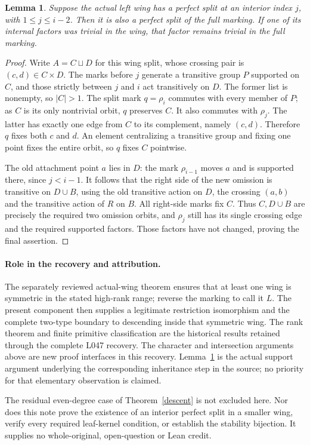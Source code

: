 \documentclass[11pt,a4paper]{article}
\newtheorem{lemma}[theorem]{Lemma}
\begin{document}
\begin{lemma}\label{inherit}
Suppose the actual left wing has a perfect split at an interior
index $j$, with $1\le j\le i-2$. Then it is also a perfect split
of the full marking. If one of its internal factors was trivial
in the wing, that factor remains trivial in the full marking.
\end{lemma}
\begin{proof}
Write $A=C\sqcup D$ for this wing split, whose crossing pair is
$(c,d)\in C\times D$. The marks before $j$ generate a transitive
group $P$ supported on $C$, and those strictly between $j$ and
$i$ act transitively on $D$. The former list is nonempty, so
$|C|>1$. The split mark $q=\rho_i$ commutes with every member
of $P$; as $C$ is its only nontrivial orbit, $q$ preserves $C$.
It also commutes with $\rho_j$. The latter has exactly one
edge from $C$ to its complement, namely $(c,d)$. Therefore $q$
fixes both $c$ and $d$. An element centralizing a transitive
group and fixing one point fixes the entire orbit, so $q$
fixes $C$ pointwise.

The old attachment point $a$ lies in $D$: the mark
$\rho_{i-1}$ moves $a$ and is supported there, since $j<i-1$.
It follows that the right side of the new omission is transitive
on $D\cup B$, using the old transitive action on $D$, the
crossing $(a,b)$ and the transitive action of $R$ on $B$.
All right-side marks fix $C$. Thus $C,D\cup B$ are precisely
the required two omission orbits, and $\rho_j$ still has its
single crossing edge and the required supported factors.
Those factors have not changed, proving the final assertion.
\end{proof}

\paragraph{Role in the recovery and attribution.}
The separately reviewed actual-wing theorem ensures that at
least one wing is symmetric in the stated high-rank range;
reverse the marking to call it $L$. The present component then
supplies a legitimate restriction isomorphism and the complete
two-type boundary to descending inside that symmetric wing.
The rank theorem and finite primitive classification are the
historical results retained through the complete L047 recovery.
The character and intersection arguments above are new proof
interfaces in this recovery. Lemma~\ref{inherit} is the actual
support argument underlying the corresponding inheritance step
in the source; no priority for that elementary observation is
claimed.

The residual even-degree case of Theorem~\ref{descent} is not
excluded here. Nor does this note prove the existence of an
interior perfect split in a smaller wing, verify every required
leaf-kernel condition, or establish the stability bijection.
It supplies no whole-original, open-question or Lean credit.
\end{document}
